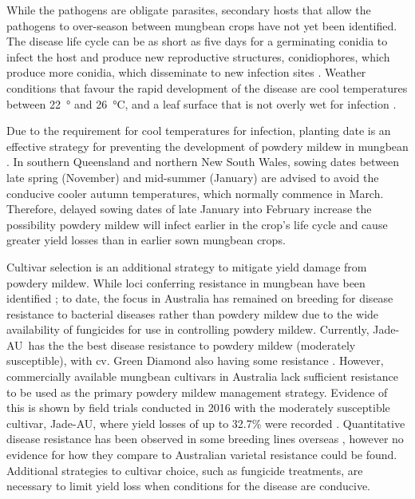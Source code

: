 \documentclass[agronomy,article,submit,moreauthors,pdftex]{mdpi}
\newcommand{\pbr}{\scalerel*{\texttt{[image: pbr\_glyph]}}{X}\ }
\begin{document}
While the pathogens are obligate parasites, secondary hosts that allow the pathogens to over-season between mungbean crops have not yet been identified.
The disease life cycle can be as short as five days for a germinating conidia to infect the host and produce new reproductive structures, conidiophores, which produce more conidia, which disseminate to new infection sites \citep{Sparks2017}.
Weather conditions that favour the rapid development of the disease are cool temperatures between 22~° and 26~°C, and a leaf surface that is not overly wet for infection \citep{Kelly2017a}.

Due to the requirement for cool temperatures for infection, planting date is an effective strategy for preventing the development of powdery mildew in mungbean \citep{AMAplanting}.
In southern Queensland and northern New South Wales, sowing dates between late spring (November) and mid-summer (January) are advised to avoid the conducive cooler autumn temperatures, which normally commence in March.
Therefore, delayed sowing dates of late January into February increase the possibility powdery mildew will infect earlier in the crop's life cycle and cause greater yield losses than in earlier sown mungbean crops.

Cultivar selection is an additional strategy to mitigate yield damage from powdery mildew.
While loci conferring resistance in mungbean have been identified \citep{Humphry2003, Zhang2008}; to date, the focus in Australia has remained on breeding for disease resistance to bacterial diseases rather than powdery mildew due to the wide availability of fungicides for use in controlling powdery mildew.
Currently, Jade-AU\pbr has the the best disease resistance to powdery mildew (moderately susceptible), with cv. Green Diamond also having some resistance \citep{Sparks2017}.
However, commercially available mungbean cultivars in Australia lack sufficient resistance to be used as the primary powdery mildew management strategy.
Evidence of this is shown by field trials conducted in 2016 with the moderately susceptible cultivar, Jade-AU, where yield losses of up to 32.7\% were recorded \citep{SueThompson2016}.
Quantitative disease resistance has been observed in some breeding lines overseas \citep{Pandey2018, Chankaew2013}, however no evidence for how they compare to Australian varietal resistance could be found.
Additional strategies to cultivar choice, such as fungicide treatments, are necessary to limit yield loss when conditions for the disease are conducive.
\end{document}
